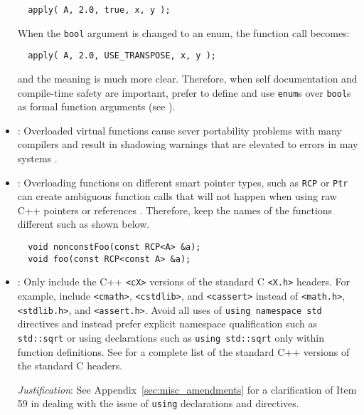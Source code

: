 \begin{itemize}
{\small\begin{verbatim}
  apply( A, 2.0, true, x, y );\end{verbatim}}

When the {}\texttt{bool} argument is changed to an enum, the function call
becomes:

{\small\begin{verbatim}
  apply( A, 2.0, USE_TRANSPOSE, x, y );
\end{verbatim}}

and the meaning is much more clear.  Therefore, when self
documentation and compile-time safety are important, prefer to define
and use {}\texttt{enum}s over {}\texttt{bool}s as formal function
arguments (see {}\cite[Section 12.6]{CodeComplete2nd04}).

{}\item\GCGOverloadedVirtualFunctions: Overloaded virtual functions
cause sever portability problems with many compilers and result in
shadowing warnings that are elevated to errors in may systems
{}\cite[Item 33]{EffectiveC++3rd05}.


{}\item\GCGAvoidSmartPtrFuncOverloads: Overloading functions on different
smart pointer types, such as {}\texttt{RCP} or {}\texttt{Ptr} can create
ambiguous function calls that will not happen when using raw C++ pointers or
references {}\cite{TeuchosMemoryManagementGuide}.  Therefore, keep the names
of the functions different such as shown below.

{\small\begin{verbatim}
  void nonconstFoo(const RCP<A> &a);
  void foo(const RCP<const A> &a);
\end{verbatim}}


{}\item\GCGStandardCppHeaders: Only include the C++ {}\texttt{<cX>} versions
of the standard C {}\texttt{<X.h>} headers.  For example, include
{}\texttt{<cmath>}, {}\texttt{<cstdlib>}, and {}\texttt{<cassert>} instead of
{}\texttt{<math.h>}, {}\texttt{<stdlib.h>}, and {}\texttt{<assert.h>}.  Avoid
all uses of {}\texttt{using namespace std} directives and instead prefer
explicit namespace qualification such as {}\texttt{std::sqrt} or using
declarations such as {}\texttt{using std::sqrt} only within function
definitions.  See {}\cite[Section 16.1.2]{stroustrup97} for a complete list of
the standard C++ versions of the standard C headers.

{}\textit{Justification}: See Appendix~\ref{sec:misc_amendments} for a
clarification of Item 59 in {}\cite{C++CodingStandards05} dealing with the
issue of {}\texttt{using} declarations and directives.



\end{itemize}
